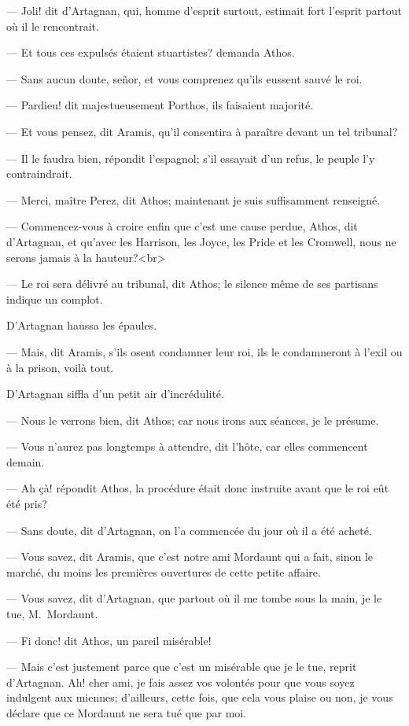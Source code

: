 — Joli! dit d'Artagnan, qui, homme d'esprit surtout, estimait fort l'esprit partout où il le rencontrait.

— Et tous ces expulsés étaient stuartistes? demanda Athos.

— Sans aucun doute, señor, et vous comprenez qu'ils eussent sauvé le roi.

— Pardieu! dit majestueusement Porthos, ils faisaient majorité.

— Et vous pensez, dit Aramis, qu'il consentira à paraître devant un tel tribunal?

— Il le faudra bien, répondit l'espagnol; s'il essayait d'un refus, le peuple l'y contraindrait.

— Merci, maître Perez, dit Athos; maintenant je suis suffisamment renseigné.

— Commencez-vous à croire enfin que c'est une cause perdue, Athos, dit d'Artagnan, et qu'avec les Harrison, les Joyce, les
Pride et les Cromwell, nous ne serons jamais à la hauteur?<br> 

— Le roi sera délivré au tribunal, dit Athos; le silence même de ses partisans indique un complot.

D'Artagnan haussa les épaules.

— Mais, dit Aramis, s'ils osent condamner leur roi, ils le condamneront à l'exil ou à la prison, voilà tout.

D'Artagnan siffla d'un petit air d'incrédulité.

— Nous le verrons bien, dit Athos; car nous irons aux séances, je le présume.

— Vous n'aurez pas longtemps à attendre, dit l'hôte, car elles commencent demain.

— Ah çà! répondit Athos, la procédure était donc instruite avant que le roi eût été pris?

— Sans doute, dit d'Artagnan, on l'a commencée du jour où il a été acheté.

— Vous savez, dit Aramis, que c'est notre ami Mordaunt qui a fait, sinon le marché, du moins les premières ouvertures de cette petite affaire.

— Vous savez, dit d'Artagnan, que partout où il me tombe sous la main, je le tue, M.~Mordaunt.

— Fi donc! dit Athos, un pareil misérable!

— Mais c'est justement parce que c'est un misérable que je le tue, reprit d'Artagnan. Ah! cher ami, je fais assez vos volontés pour que vous soyez indulgent aux miennes; d'ailleurs, cette fois, que cela vous plaise ou non, je vous déclare que ce Mordaunt ne sera tué que par moi.

